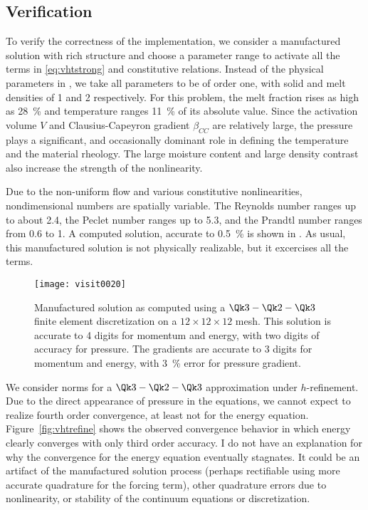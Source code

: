 \subsection{Verification}\label{ssec:vhtverif}
To verify the correctness of the implementation, we consider a manufactured solution with rich structure and choose a parameter range to activate all the terms in \eqref{eq:vhtstrong} and constitutive relations.
Instead of the physical parameters in , we take all parameters to be of order one, with solid and melt densities of 1 and 2 respectively.
For this problem, the melt fraction rises as high as \SI{28}{\percent} and temperature ranges \SI{11}{\percent} of its absolute value.
Since the activation volume $V$ and Clausius-Capeyron gradient $\beta_{CC}$ are relatively large, the pressure plays a significant, and occasionally dominant role in defining the temperature and the material rheology.
The large moisture content and large density contrast also increase the strength of the nonlinearity.

Due to the non-uniform flow and various constitutive nonlinearities, nondimensional numbers are spatially variable.
The Reynolds number ranges up to about \num{2.4}, the Peclet number ranges up to \num{5.3}, and the Prandtl number ranges from \num{0.6} to 1.
A computed solution, accurate to \SI{0.5}{\percent} is shown in .
As usual, this manufactured solution is not physically realizable, but it excercises all the terms.

\begin{figure}
  \centering\texttt{[image: visit0020]}
  \caption{Manufactured solution as computed using a $\Qk 3 - \Qk 2 - \Qk 3$ finite element discretization on a $12\times 12\times 12$ mesh.
    This solution is accurate to 4 digits for momentum and energy, with two digits of accuracy for pressure.
    The gradients are accurate to 3 digits for momentum and energy, with \SI{3}{\percent} error for pressure gradient.}\label{fig:vhtexact}
\end{figure}

We consider norms for a $\Qk 3 - \Qk 2 - \Qk 3$ approximation under $h$-refinement.
Due to the direct appearance of pressure in the equations, we cannot expect to realize fourth order convergence, at least not for the energy equation.
Figure~\ref{fig:vhtrefine} shows the observed convergence behavior in which energy clearly converges with only third order accuracy.
I do not have an explanation for why the convergence for the energy equation eventually stagnates.
It could be an artifact of the manufactured solution process (perhaps rectifiable using more accurate quadrature for the forcing term), other quadrature errors due to nonlinearity, or stability of the continuum equations or discretization.

